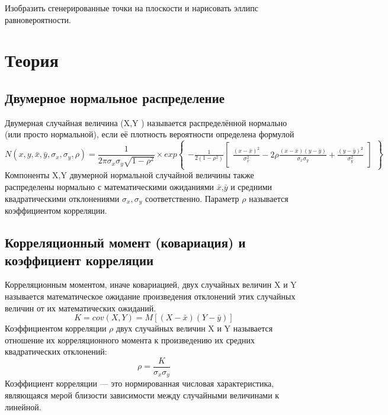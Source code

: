 \documentclass[12pt,a4paper]{scrartcl}
\begin{document}
Изобразить сгенерированные точки на плоскости и нарисовать эллипс
равновероятности.

\section{Теория}

\subsection{Двумерное нормальное распределение}
	Двумерная случайная величина (X,Y ) называется распределённой нормально (или просто нормальной), если её плотность вероятности определена формулой
	\begin{equation}
	    N(x, y, \bar{x}, \bar{y}, \sigma_{x}, \sigma_{y}, \rho) = 
	    \frac{1}{2\pi\sigma_{x}\sigma_{y}\sqrt{1-\rho^{2}}} \times
	    exp{\begin{Bmatrix}
	        -\frac{1}{2(1-\rho^{2})}
	        \begin{bmatrix}
	        \frac{(x-\bar{x})^{2}}{\sigma_{x}^{2}} - 2\rho\frac{(x-\bar{x})(y-\bar{y})}{\sigma_{x}\sigma_{y}} + \frac{(y-\bar{y})^{2}}{\sigma_{y}^{2}}
            \end{bmatrix}
            \end{Bmatrix}}
	\end{equation}
	Компоненты X,Y двумерной нормальной случайной величины также распределены нормально с математическими ожиданиями $\bar{x}$,$\bar{y}$ и средними квадратическими отклонениями $\sigma_{x},\sigma_{y}$ соответственно.
	Параметр $\rho$ называется коэффициентом корреляции.


	
	\subsection{Корреляционный момент (ковариация) и коэффициент корреляции}
	Корреляционным моментом, иначе ковариацией, двух случайных величин X и Y называется математическое ожидание произведения отклонений этих случайных величин от их математических ожиданий.
	\begin{equation}
	    K = cov(X, Y) = M[(X - \bar{x})(Y - \bar{y})]
	   \label{K}
	\end{equation}
	Коэффициентом корреляции $\rho$ двух случайных величин X и Y называется отношение их корреляционного момента к произведению их средних квадратических отклонений:
	\begin{equation}
	    \rho = \frac{K}{\sigma_{x}\sigma_{y}}
	    \label{ro}
	\end{equation}
	Коэффициент корреляции — это нормированная числовая характеристика, являющаяся мерой близости зависимости между случайными величинами к линейной.
\end{document}
